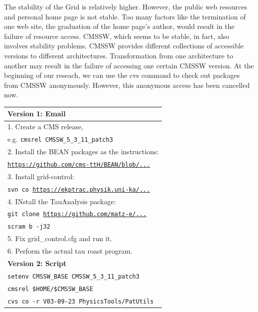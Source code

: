 \documentclass{acm_proc_article-sp}
\begin{document}
The stability of the Grid is relatively higher. However, the
public web resources and personal home page is not stable. Too many factors
like the termination of one web site, the graduation of the home page's author,
would result in the failure of resource access. CMSSW, which seems to be
stable, in fact, also involves stability problems. CMSSW provides different
collections of accessible versions to different architectures. Transformation
from one architecture to another may result in the failure of accessing one
certain CMSSW version. At the beginning of our reseach, we can use the cvs command to
check out packages from CMSSW anonymously. However, this anonymous access has
been cancelled now.

\begin{table}
    \centering
    \begin{tabular}{|l|}
        \hline
        {\bf Version 1: Email}\\ \hline
        1. Create a CMS release,\\
            \hspace{9pt} e.g. {\tt cmsrel CMSSW\_5\_3\_11\_patch3} \\
        2. Install the BEAN packages as the instructions: \\
            \hspace{9pt} {\tt \url{https://github.com/cms-ttH/BEAN/blob/...}}\\
        3. Install grid-control: \\ 
            \hspace{9pt} {\tt svn co \url{https://ekptrac.physik.uni-ka/...}} \\
        4. INstall the TauAnalysis package: \\
           \hspace{9pt} {\tt git clone \url{https://github.com/matz-e/...}} \\
           \hspace{9pt} {\tt scram b -j32} \\
        5. Fix grid\_control.cfg and run it. \\
        6. Perform the actual tau roast program. \\ 
        \hline
        {\bf Version 2: Script}\\ \hline
        {\tt setenv CMSSW\_BASE CMSSW\_5\_3\_11\_patch3} \\
        {\tt cmsrel \$HOME/\$CMSSW\_BASE} \\
        {\tt cvs co -r V03-09-23 PhysicsTools/PatUtils} \\

\end{tabular}
\end{table}
\end{document}
